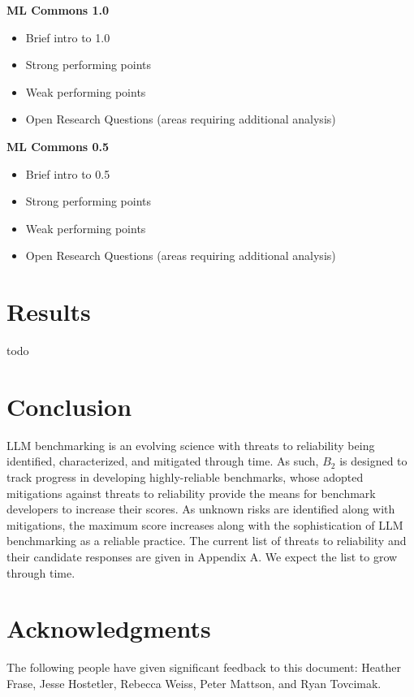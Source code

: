 \documentclass{article}
\newcommand\bb{$B_2$ }
\begin{document}
{\bf ML Commons 1.0}
\begin{itemize}
\item Brief intro to 1.0
\item Strong performing points
\item Weak performing points
\item Open Research Questions (areas requiring additional analysis)
\end{itemize}

{\bf ML Commons 0.5}
\begin{itemize}
\item Brief intro to 0.5
\item Strong performing points
\item Weak performing points
\item Open Research Questions (areas requiring additional analysis)
\end{itemize}

\section{Results}
todo

\section{Conclusion}

LLM benchmarking is an evolving science with threats to reliability being identified, characterized, and mitigated through time. As such, \bb is designed to track progress in developing highly-reliable benchmarks, whose adopted mitigations against threats to reliability provide the means for benchmark developers to increase their scores. As unknown risks are identified along with mitigations, the maximum score increases along with the sophistication of LLM benchmarking as a reliable practice. The current list of threats to reliability and their candidate responses are given in Appendix A. We expect the list to grow through time.
\section{Acknowledgments}
The following people have given significant feedback to this document: Heather Frase, Jesse Hostetler, Rebecca Weiss, Peter Mattson, and Ryan Tovcimak.





\appendix 




\end{document}
